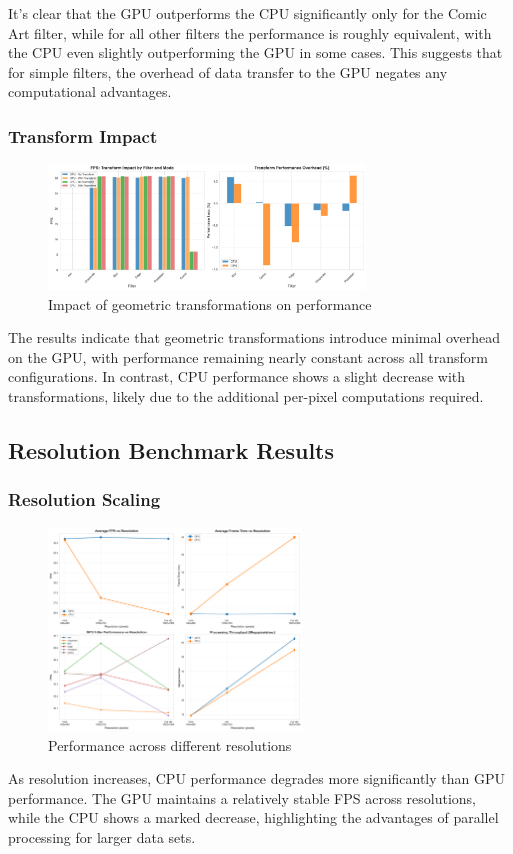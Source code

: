 \documentclass[12pt,a4paper]{article}
\begin{document}
It's clear that the GPU outperforms the CPU significantly only for the Comic Art filter, while for all other filters the performance is roughly equivalent, with the CPU even slightly outperforming the GPU in some cases. This suggests that for simple filters, the overhead of data transfer to the GPU negates any computational advantages.

\subsubsection{Transform Impact}

\begin{figure}[H]
    \centering
    \includegraphics[width=0.75\textwidth]{../data/plots/transform_comparison.png}
    \caption{Impact of geometric transformations on performance}
    \label{fig:transform_impact}
\end{figure}

The results indicate that geometric transformations introduce minimal overhead on the GPU, with performance remaining nearly constant across all transform configurations. In contrast, CPU performance shows a slight decrease with transformations, likely due to the additional per-pixel computations required.

\subsection{Resolution Benchmark Results}

\subsubsection{Resolution Scaling}
\begin{figure}[H]
    \centering
    \includegraphics[width=0.6\textwidth]{../data/plots/resolution_impact.png}
    \caption{Performance across different resolutions}
    \label{fig:resolution_impact}
\end{figure}
As resolution increases, CPU performance degrades more significantly than GPU performance. The GPU maintains a relatively stable FPS across resolutions, while the CPU shows a marked decrease, highlighting the advantages of parallel processing for larger data sets.
\end{document}
